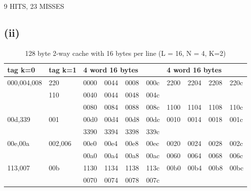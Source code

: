 \documentclass{article}
\begin{document}
9 HITS, 23 MISSES

\subsection{(ii)}

\begin{table}[H]
	\centering
	\caption{128 byte 2-way cache with 16 bytes per line (L = 16, N = 4, K=2)}
	\label{my-label}
	\begin{tabular}{|l|l|l|l|l|l|l|l|l|l|}
		\hline
		tag k=0     & tag k=1 & \multicolumn{4}{l|}{4 word 16 bytes}                                     & \multicolumn{4}{l|}{4 word 16 bytes} \\ \hline
		000,004,008 & 220 & 0000 & 0044 & 0008 & 000c & 2200 & 2204 & 2208 & 220c  \\
 &110 &0040 & 0044 & 0048& 004c& & & & \\
 & &0080 & 0084& 0088&008c &1100 &1104 &1108 &110c\\ \hline
		00d,339     & 001     &   00d0   &    00d4  & 00d8  &  00dc &  0010    & 0014     &  0018    & 001c \\
		 & &3390 & 3394& 3398& 339c& & & & \\
		
		 \hline
		00e,00a     & 002,006 &  00e0  &00e4  &  00e8  &00ec  &  0020    &    0024  &    0028  & 002c \\

 & &00a0 &00a4 &00a8 &00ac &0060 &0064 &0068 &006c \\
 \hline
		113,007     & 00b     & 1130 &1134 & 1138& 113c  &    00b0  &     00b4 &     00b8 & 00bc \\
 & &0070 & 0074& 0078& 007c& & & & \\
 \hline
	\end{tabular}
\end{table}
\end{document}
